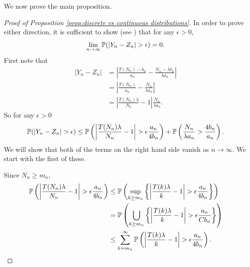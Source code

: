 	We now prove the main proposition.
	\begin{proof}[Proof of Proposition \ref{prop:discrete vs continuous distributions}]
		In order to prove either direction, it is sufficient to show (see \cite[Theorem 25.4]{Billingsley1995-en}) that for any $\epsilon > 0$,
		\begin{equation}
			\lim_{n\rightarrow \infty} \mathbb{P}(|Y_n - Z_n| > \epsilon) = 0.
			\label{eq:Prob Yn - Zn > epsilon goes to zero}
		\end{equation}
		First note that
		\begin{align}
			|Y_n - Z_n| &= \left|\frac{T(N_n) - b_n}{a_n} - \frac{N_n - \lambda b_n}{\lambda a_n}\right|\\
			&= \left|\frac{T(N_n)}{a_n} - \frac{N_n}{\lambda a_n}\right|\\
			&= \left|\frac{T(N_n) \lambda }{N_n} - 1\right|\frac{N_n}{\lambda a_n}.
		\end{align}
		So for any $\epsilon > 0$
		\begin{equation}
			\mathbb{P}(|Y_n - Z_n| > \epsilon) \leq \mathbb{P}\left(\left|\frac{T(N_n)\lambda}{N_n} - 1\right| > \epsilon\frac{a_n}{4 b_n} \right) + \mathbb{P}\left(\frac{N_n}{\lambda a_n} > \frac{4 b_n}{a_n} \right).
			\label{eq:both terms difference Y_n Z_n}
		\end{equation}
		We will show that both of the terms on the right hand side vanish as $n \rightarrow \infty$. We start with the first of these.

		Since $N_n \geq m_n$, 
		\begin{align}
			\prob\left(\left|\frac{T(N_n)\lambda}{N_n} - 1\right| > \epsilon\frac{a_n}{4 b_n} \right) &\leq \prob\left(\sup_{k \geq m_n}\left\{\left|\frac{T(k)\lambda}{k} - 1\right| > \epsilon\frac{a_n}{4 b_n} \right\} \right)\\
			&= \prob\left(\bigcup_{k \geq m_n} \left\{ \left|\frac{T(k)\lambda}{k} - 1\right| > \epsilon\frac{a_n}{C b_n} \right\}\right)\\
			&\leq \sum_{k = m_n}^\infty \prob\left(\left|\frac{T(k)\lambda}{k} - 1\right| > \epsilon\frac{a_n}{4 b_n} \right).%
		\end{align}


\end{proof}
